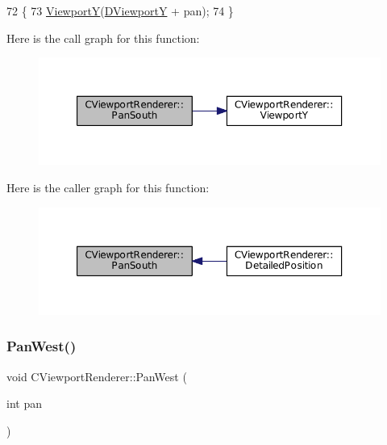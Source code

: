 \begin{DoxyCode}
72                                        \{
73     \hyperlink{classCViewportRenderer_add3d4da286927abe2f19fbb37fd42ed5}{ViewportY}(\hyperlink{classCViewportRenderer_ae13dd437a3da3d2bab16bc7ba61cb78f}{DViewportY} + pan);
74 \}
\end{DoxyCode}
Here is the call graph for this function\+:\nopagebreak
\begin{figure}[H]
\begin{center}
\leavevmode
\includegraphics[width=350pt]{classCViewportRenderer_ad4aa68d96923dbea1bfd9ae3f23a3132_cgraph}
\end{center}
\end{figure}
Here is the caller graph for this function\+:\nopagebreak
\begin{figure}[H]
\begin{center}
\leavevmode
\includegraphics[width=350pt]{classCViewportRenderer_ad4aa68d96923dbea1bfd9ae3f23a3132_icgraph}
\end{center}
\end{figure}
\hypertarget{classCViewportRenderer_aa09c1b984311f77ea1cdcdc74a7a0316}{}\label{classCViewportRenderer_aa09c1b984311f77ea1cdcdc74a7a0316} 
\subsubsection{\texorpdfstring{Pan\+West()}{PanWest()}}
{\footnotesize\ttfamily void C\+Viewport\+Renderer\+::\+Pan\+West (\begin{DoxyParamCaption}\item[{int}]{pan }\end{DoxyParamCaption})}



